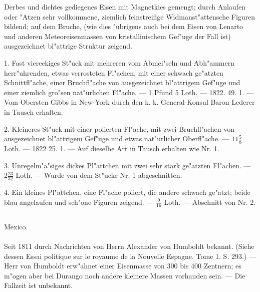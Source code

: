 \documentclass[a4paper, 11pt, oneside, polutonikogreek, german]{article}
\begin{document}
\setlength{\leftskip}{0pt}
\setlength{\parindent}{20pt}

Derbes und dichtes gediegenes Eisen mit Magnetkies gemengt; durch Anlaufen oder "Atzen sehr vollkommene, ziemlich feinstreifige Widmanst"attensche Figuren bildend; auf dem Bruche, (wie dies "ubrigens auch bei dem Eisen von Lenarto und anderen Meteoreisenmassen von kristallinischem Gef"uge der Fall ist) ausgezeichnet bl"attrige Struktur zeigend.

1. Fast viereckiges St"uck mit mehreren vom Abmei"seln und Abh"ammern herr"uhrenden, etwas verrosteten Fl"achen, mit einer schwach ge"atzten Schnittfl"ache, einer Bruchfl"ache von ausgezeichnet bl"attrigem Gef"uge und einer ziemlich gro"sen nat"urlichen Fl"ache. --- 1 Pfund 5 Loth. --- 1822. 49. 1. --- Vom Obersten Gibbs in New-York durch den k. k. General-Konsul Baron Lederer in Tausch erhalten.

2. Kleineres St"uck mit einer polierten Fl"ache, mit zwei Bruchfl"achen von ausgezeichnet bl"attrigem Gef"uge und etwas nat"urlicher Oberfl"ache. --- $\mathfrak{11\frac{5}{8}}$ Loth. --- 1822 25. 1. --- Auf dieselbe Art in Tausch erhalten wie Nr. 1.

3. Unregelm"a"siges dickes Pl"attchen mit zwei sehr stark ge"atzten Fl"achen. --- $\mathfrak{2\frac{23}{32}}$ Loth. --- Wurde von dem St"ucke Nr. 1 abgeschnitten.

4. Ein kleines Pl"attchen, eine Fl"ache poliert, die andere schwach ge"atzt; beide blau angelaufen und sch"one Figuren zeigend. --- $\mathfrak{\frac{9}{16}}$ Loth. --- Abschnitt von Nr. 2.
\subsection{}
\begin{center}

Mexico.
\end{center}
\paragraph{}
Seit 1811 durch Nachrichten von Herrn Alexander von Humboldt bekannt. (Siehe dessen Essai politique sur le royaume de la Nouvelle Espagne. Tome 1. S. 293.) --- Herr von Humboldt erw"ahnet einer Eisenmasse von 300 bis 400 Zentnern; es m"ogen aber bei Durango noch andere kleinere Massen vorhanden sein. --- Die Fallzeit ist unbekannt.

\setlength{\leftskip}{10mm}
\setlength{\parindent}{0pt}
\end{document}
